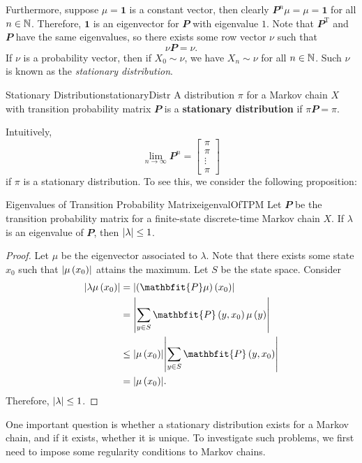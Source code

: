 \documentclass[math, code]{amznotes}
\theoremstyle{remark}
\begin{document}
Furthermore, suppose $\mu = \mathbf{1}$ is a constant vector, then clearly $\mathbfit{P}^n\mu = \mu = \mathbf{1}$ for all $n \in \mathbb{N}$. Therefore, $\mathbf{1}$ is an eigenvector for $\mathbfit{P}$ with eigenvalue $1$. Note that $\mathbfit{P}^{\mathrm{T}}$ and $\mathbfit{P}$ have the same eigenvalues, so there exists some row vector $\nu$ such that 
\begin{equation*}
    \nu\mathbfit{P} = \nu.
\end{equation*}
If $\nu$ is a probability vector, then if $X_0 \sim \nu$, we have $X_n \sim \nu$ for all $n \in \mathbb{N}$. Such $\nu$ is known as the \textit{stationary distribution}.
\begin{dfnbox}{Stationary Distribution}{stationaryDistr}
    A distribution $\pi$ for a Markov chain $X$ with transition probability matrix $\mathbfit{P}$ is a {\color{red} \textbf{stationary distribution}} if $\pi\mathbfit{P} = \pi$.
\end{dfnbox}
Intuitively, 
\begin{equation*}
    \lim_{n \to \infty}\mathbfit{P}^n = \begin{bmatrix}
        \pi \\
        \pi \\
        \vdots \\
        \pi
    \end{bmatrix}
\end{equation*}
if $\pi$ is a stationary distribution. To see this, we consider the following proposition:
\begin{probox}{Eigenvalues of Transition Probability Matrix}{eigenvalOfTPM}
    Let $\mathbfit{P}$ be the transition probability matrix for a finite-state discrete-time Markov chain $X$. If $\lambda$ is an eigenvalue of $\mathbfit{P}$, then ${\left\lvert {\lambda} \right\rvert} \leq 1$.
    \tcblower
    \begin{proof}
        Let $\mu$ be the eigenvector associated to $\lambda$. Note that there exists some state $x_0$ such that ${\left\lvert {\mu\left(x_0\right)} \right\rvert}$ attains the maximum. Let $S$ be the state space. Consider 
        \begin{align*}
            \abs{\lambda\mu\left(x_0\right)} & = \abs{\left(\mathbfit{P}\mu\right)\left(x_0\right)} \\
            & = \abs{\sum_{y \in S}\mathbfit{P}\left(y, x_0\right)\mu\left(y\right)} \\
            & \leq \abs{\mu\left(x_0\right)}\abs{\sum_{y \in S}\mathbfit{P}\left(y, x_0\right)} \\
            & = \abs{\mu\left(x_0\right)}.
        \end{align*}
        Therefore, ${\left\lvert {\lambda} \right\rvert} \leq 1$.
    \end{proof}
\end{probox}
One important question is whether a stationary distribution exists for a Markov chain, and if it exists, whether it is unique. To investigate such problems, we first need to impose some regularity conditions to Markov chains.
\end{document}
